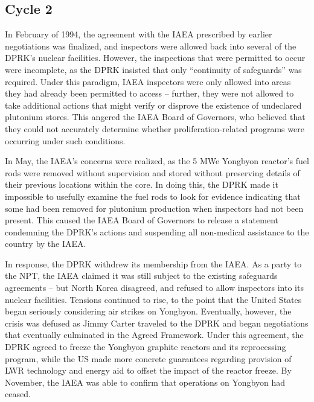 \documentclass{article}
\begin{document}
\subsection{Cycle 2}

In February of 1994, the agreement with the IAEA prescribed by earlier negotiations was finalized, and inspectors were allowed back into several of the DPRK’s nuclear facilities\cite{davenport}. However, the inspections that were permitted to occur were incomplete, as the DPRK insisted that only “continuity of safeguards” was required\cite{iaea09}. Under this paradigm, IAEA inspectors were only allowed into areas they had already been permitted to access – further, they were not allowed to take additional actions that might verify or disprove the existence of undeclared plutonium stores. This angered the IAEA Board of Governors, who believed that they could not accurately determine whether proliferation-related programs were occurring under such conditions\cite{davenport}.

In May, the IAEA’s concerns were realized, as the 5 MWe Yongbyon reactor’s fuel rods were removed without supervision and stored without preserving details of their previous locations within the core. In doing this, the DPRK made it impossible to usefully examine the fuel rods to look for evidence indicating that some had been removed for plutonium production when inspectors had not been present\cite{nobacksies}. This caused the IAEA Board of Governors to release a statement condemning the DPRK’s actions and suspending all non-medical assistance to the country by the IAEA\cite{iaea94}.

In response, the DPRK withdrew its membership from the IAEA. As a party to the NPT, the IAEA claimed it was still subject to the existing safeguards agreements – but North Korea disagreed, and refused to allow inspectors into its nuclear facilities\cite{iaea09}. Tensions continued to rise, to the point that the United States began seriously considering air strikes on Yongbyon\cite{jun}. Eventually, however, the crisis was defused as Jimmy Carter traveled to the DPRK and began negotiations that eventually culminated in the Agreed Framework\cite{nti15}. Under this agreement, the DPRK agreed to freeze the Yongbyon graphite reactors and its reprocessing program, while the US made more concrete guarantees regarding provision of LWR technology and energy aid to offset the impact of the reactor freeze\cite{agreed}. By November, the IAEA was able to confirm that operations on Yongbyon had ceased\cite{davenport}.
\end{document}
